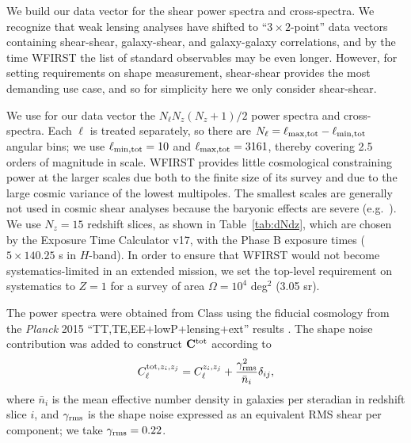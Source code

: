 \documentclass[aps,prd, amsmath,amssymb,superscriptaddress,showkeys,nofootinbib,reprint,preprintnumbers]{revtex4-1}
\begin{document}
\begin{widetext}
We build our data vector for the shear power spectra and cross-spectra. We recognize that weak lensing analyses have shifted to ``$3\times 2$-point'' data vectors containing shear-shear, galaxy-shear, and galaxy-galaxy correlations, and by the time WFIRST the list of standard observables may be even longer. However, for setting requirements on shape measurement, shear-shear provides the most demanding use case, and so for simplicity here we only consider shear-shear.

We use for our data vector the $N_\ell N_z(N_z+1)/2$ power spectra and
cross-spectra. Each $\ell$ is treated separately, so there are
$N_\ell=\ell_{\rm max,tot}-\ell_{\rm min,tot}$ angular bins; we use
$\ell_{\rm min,tot}=10$ and $\ell_{\rm max,tot}=3161$, thereby
covering 2.5 orders of magnitude in scale. WFIRST provides little
cosmological constraining power at the larger scales due both to the
finite size of its survey and due to the large cosmic variance of the
lowest multipoles. The smallest scales are generally not used in
cosmic shear analyses because the baryonic effects are severe (e.g.\
\cite{2008PhRvD..77d3507Z, 2013PhRvD..87d3509Z}). We use $N_z=15$
redshift slices, as shown in Table~\ref{tab:dNdz}, which are chosen by the Exposure Time Calculator \cite{2012arXiv1204.5151H} v17, with the Phase B exposure times ($5\times 140.25$ s in $H$-band). In order to ensure
that WFIRST would not become systematics-limited in an extended
mission, we set the top-level requirement on systematics to $Z=1$ for
a survey of area $\Omega =10^4$ deg$^2$ (3.05 sr).

The power spectra were obtained from {\sc Class}
\cite{2011JCAP...07..034B} using the fiducial cosmology from the
{\slshape Planck} 2015 ``TT,TE,EE+lowP+lensing+ext'' results
\citep{2016A&A...594A..13P}. The shape noise contribution was added to
construct ${\bf C}^{\rm tot}$ according to
\begin{equation}
C^{{\rm tot},z_i,z_j}_\ell = C^{z_i,z_j}_\ell + \frac{\gamma_{\rm rms}^2}{\bar n_i}\delta_{ij},
\end{equation}
where $\bar n_i$ is the mean effective number density in galaxies per
steradian in redshift slice $i$, and $\gamma_{\rm rms}$ is the shape
noise expressed as an equivalent RMS shear per component; we take
$\gamma_{\rm rms} = 0.22$.


\end{widetext}
\end{document}
